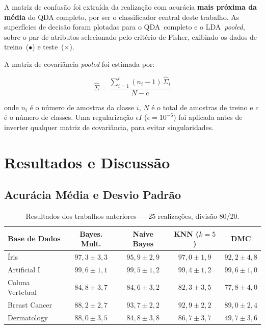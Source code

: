 \documentclass[12pt, a4paper]{article}
\begin{document}
A matriz de confusão foi extraída da realização com acurácia
\textbf{mais próxima da média} do QDA completo, por ser o
classificador central deste trabalho. As superfícies de decisão foram
plotadas para o QDA~completo e o LDA~\textit{pooled}, sobre o par de
atributos selecionado pelo critério de Fisher, exibindo os dados de
treino~($\bullet$) e teste~($\times$).

A matriz de covariância \textit{pooled} foi estimada por:

\begin{equation}
    \hat{\Sigma} =
    \frac{\displaystyle\sum_{i=1}^{c}(n_i - 1)\,\hat{\Sigma}_i}{N - c}
\end{equation}

\noindent onde $n_i$ é o número de amostras da classe $i$, $N$ é o
total de amostras de treino e $c$ é o número de classes. Uma
regularização $\epsilon I$ ($\epsilon = 10^{-6}$) foi aplicada antes
de inverter qualquer matriz de covariância, para evitar singularidades.

\section{Resultados e Discussão}

\subsection{Acurácia Média e Desvio Padrão}


\begin{table}[H]
    \centering
    \caption{Resultados dos trabalhos anteriores --- 25 realizações, divisão 80/20.}
    \label{tab:results_anteriores}
    \begin{tabular}{@{}lcccc@{}}
        \toprule
        \textbf{Base de Dados} & \textbf{Bayes. Mult.} & \textbf{Naive Bayes} & \textbf{KNN ($k{=}5$)} & \textbf{DMC} \\
        \midrule
        Íris             & $97{,}3 \pm 3{,}3$ & $95{,}9 \pm 2{,}9$ & $97{,}0 \pm 1{,}9$ & $92{,}2 \pm 4{,}8$ \\
        Artificial I     & $99{,}6 \pm 1{,}1$ & $99{,}5 \pm 1{,}2$ & $99{,}4 \pm 1{,}2$ & $99{,}6 \pm 1{,}0$ \\
        Coluna Vertebral & $84{,}8 \pm 3{,}7$ & $84{,}6 \pm 3{,}2$ & $82{,}3 \pm 3{,}5$ & $77{,}8 \pm 4{,}0$ \\
        Breast Cancer    & $88{,}2 \pm 2{,}7$ & $93{,}7 \pm 2{,}2$ & $92{,}9 \pm 2{,}2$ & $89{,}0 \pm 2{,}4$ \\
        Dermatology      & $88{,}0 \pm 3{,}5$ & $84{,}8 \pm 3{,}8$ & $86{,}7 \pm 3{,}7$ & $49{,}7 \pm 3{,}6$ \\
        \bottomrule
    \end{tabular}
\end{table}
\end{document}
